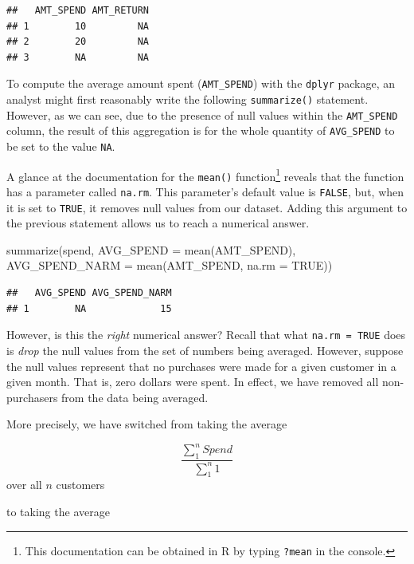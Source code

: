 \documentclass[
]{krantz}
\makeatletter
\newenvironment{Shaded}{\begin{snugshade}}{\end{snugshade}}
\newcommand{\AttributeTok}[1]{\textcolor[rgb]{0.61,0.61,0.61}{#1}}
\newcommand{\ConstantTok}[1]{\textcolor[rgb]{0,0,0}{#1}}
\newcommand{\FunctionTok}[1]{\textcolor[rgb]{0,0,0}{#1}}
\newcommand{\NormalTok}[1]{#1}
\newenvironment{kframe}{%
\medskip{}
\setlength{\fboxsep}{.8em}
 \def\at@end@of@kframe{}%
 \ifinner\ifhmode%
  \def\at@end@of@kframe{\end{minipage}}%
  \begin{minipage}{\columnwidth}%
 \fi\fi%
 \def\FrameCommand##1{\hskip\@totalleftmargin \hskip-\fboxsep
 \colorbox{shadecolor}{##1}\hskip-\fboxsep
     \hskip-\linewidth \hskip-\@totalleftmargin \hskip\columnwidth}%
 \MakeFramed {\advance\hsize-\width
   \@totalleftmargin\z@ \linewidth\hsize
   \@setminipage}}%
 {\par\unskip\endMakeFramed%
 \at@end@of@kframe}
\renewenvironment{Shaded}{\begin{kframe}}{\end{kframe}}
\makeatother
\begin{document}
\begin{verbatim}
##   AMT_SPEND AMT_RETURN
## 1        10         NA
## 2        20         NA
## 3        NA         NA
\end{verbatim}

To compute the average amount spent (\texttt{AMT\_SPEND}) with the \texttt{dplyr} package, an analyst might first reasonably write the following \texttt{summarize()} statement.
However, as we can see, due to the presence of null values within the \texttt{AMT\_SPEND} column, the result of this aggregation is for the whole quantity of \texttt{AVG\_SPEND} to be set to the value \texttt{NA}.

A glance at the documentation for the \texttt{mean()} function\footnote{This documentation can be obtained in R by typing \texttt{?mean} in the console.} reveals that the function has a parameter called \texttt{na.rm}.
This parameter's default value is \texttt{FALSE}, but, when it is set to \texttt{TRUE}, it removes null values from our dataset.
Adding this argument to the previous statement allows us to reach a numerical answer.

\begin{Shaded}
\begin{Highlighting}[]
\FunctionTok{summarize}\NormalTok{(spend, }
          \AttributeTok{AVG\_SPEND =} \FunctionTok{mean}\NormalTok{(AMT\_SPEND),}
          \AttributeTok{AVG\_SPEND\_NARM =} \FunctionTok{mean}\NormalTok{(AMT\_SPEND, }\AttributeTok{na.rm =} \ConstantTok{TRUE}\NormalTok{))}
\end{Highlighting}
\end{Shaded}

\begin{verbatim}
##   AVG_SPEND AVG_SPEND_NARM
## 1        NA             15
\end{verbatim}

However, is this the \emph{right} numerical answer?
Recall that what \texttt{na.rm\ =\ TRUE} does is \emph{drop} the null values from the set of numbers being averaged.
However, suppose the null values represent that no purchases were made for a given customer in a given month.
That is, zero dollars were spent.
In effect, we have removed all non-purchasers from the data being averaged.

More precisely, we have switched from taking the average

\[ \frac{ \sum_{1}^{n} Spend }{\sum_{1}^{n} 1} \] over all \(n\) customers

to taking the average
\end{document}
